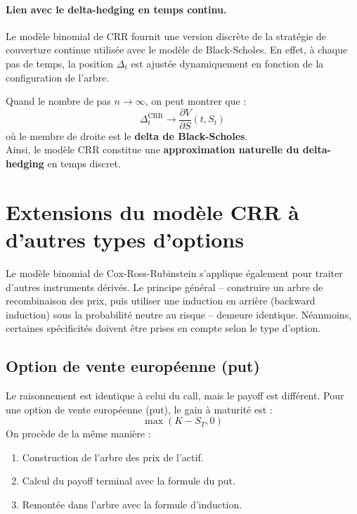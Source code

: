 \documentclass[12pt,a4paper]{article}
\begin{document}
\paragraph{Lien avec le delta-hedging en temps continu.} Le modèle binomial de CRR fournit une version discrète de la stratégie de couverture continue utilisée avec le modèle de Black-Scholes. En effet, à chaque pas de temps, la position \(\Delta_t\) est ajustée dynamiquement en fonction de la configuration de l’arbre.

Quand le nombre de pas \(n \to \infty\), on peut montrer que :
\[
\boxed{\Delta_t^{\text{CRR}} \longrightarrow \frac{\partial V}{\partial S}(t, S_t)}
\]
où le membre de droite est le \textbf{delta de Black-Scholes}.\\

Ainsi, le modèle CRR constitue une \textbf{approximation naturelle du delta-hedging} en temps discret.



\section{Extensions du modèle CRR à d'autres types d'options}

Le modèle binomial de Cox-Ross-Rubinstein s'applique également pour traiter d'autres instruments dérivés. Le principe général -- construire un arbre de recombinaison des prix, puis utiliser une induction en arrière (backward induction) sous la probabilité neutre au risque -- demeure identique. Néanmoins, certaines spécificités doivent être prises en compte selon le type d'option.

\subsection{Option de vente européenne (put)}
Le raisonnement est identique à celui du call, mais le payoff est différent. Pour une option de vente européenne (put), le gain à maturité est :
\[
\boxed{\max(K - S_T, 0)}
\]
On procède de la même manière :
\begin{enumerate}
    \item Construction de l’arbre des prix de l’actif.
    \item Calcul du payoff terminal avec la formule du put.
    \item Remontée dans l’arbre avec la formule d’induction.
\end{enumerate}
\end{document}
